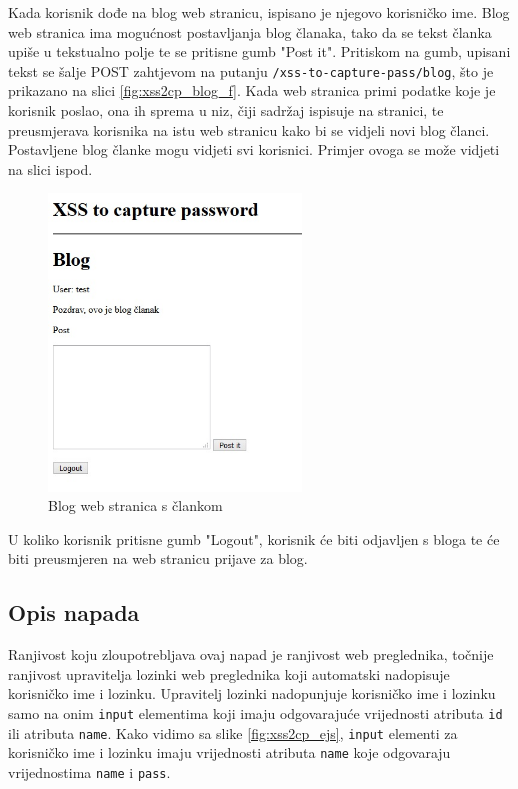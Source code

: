 \documentclass[12pt, oneside, onecolumn]{book}
\begin{document}
{Kada korisnik dođe na blog web stranicu, ispisano je njegovo korisničko ime. Blog web stranica ima mogućnost postavljanja blog članaka, tako da se tekst članka upiše u tekstualno polje te se pritisne gumb "Post it". Pritiskom na gumb, upisani tekst se šalje POST zahtjevom na putanju \texttt{/xss-to-capture-pass/blog}, što je prikazano na slici \ref{fig:xss2cp_blog_f}. Kada web stranica primi podatke koje je korisnik poslao, ona ih sprema u niz, čiji sadržaj ispisuje na stranici, te preusmjerava korisnika na istu web stranicu kako bi se vidjeli novi blog članci. Postavljene blog članke mogu vidjeti svi korisnici. Primjer ovoga se može vidjeti na slici ispod.

\begin{figure}[H]
	\begin{center}
		\includegraphics[width=0.6\textwidth]{xss2cp_blog_p.jpg}
		\caption{Blog web stranica s člankom} \label{fig:xss2cp_blog_p}
	\end{center}
\end{figure}

U koliko korisnik pritisne gumb "Logout", korisnik će biti odjavljen s bloga te će biti preusmjeren na web stranicu prijave za blog.

\subsection{Opis napada}
Ranjivost koju zloupotrebljava ovaj napad je ranjivost web preglednika, točnije ranjivost upravitelja lozinki web preglednika koji automatski nadopisuje korisničko ime i lozinku. Upravitelj lozinki nadopunjuje korisničko ime i lozinku samo na onim \texttt{input} elementima koji imaju odgovarajuće vrijednosti atributa \texttt{id} ili atributa \texttt{name}. Kako vidimo sa slike \ref{fig:xss2cp_ejs}, \texttt{input} elementi za korisničko ime i lozinku imaju vrijednosti atributa \texttt{name} koje odgovaraju vrijednostima \texttt{name} i \texttt{pass}.

}
\end{document}
